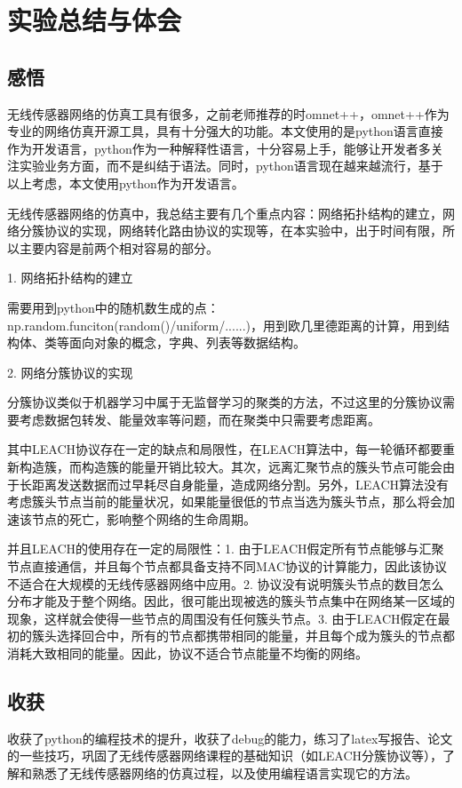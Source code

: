 \documentclass[UTF8]{article} %
\begin{document}
	\section{实验总结与体会}
	\subsection{感悟}
	无线传感器网络的仿真工具有很多，之前老师推荐的时omnet++，omnet++作为专业的网络仿真开源工具，具有十分强大的功能。本文使用的是python语言直接作为开发语言，python作为一种解释性语言，十分容易上手，能够让开发者多关注实验业务方面，而不是纠结于语法。同时，python语言现在越来越流行，基于以上考虑，本文使用python作为开发语言。
	
	无线传感器网络的仿真中，我总结主要有几个重点内容：网络拓扑结构的建立，网络分簇协议的实现，网络转化路由协议的实现等，在本实验中，出于时间有限，所以主要内容是前两个相对容易的部分。
	
	1. 网络拓扑结构的建立
	
	需要用到python中的随机数生成的点：np.random.funciton(random()/uniform/......)，用到欧几里德距离的计算，用到结构体、类等面向对象的概念，字典、列表等数据结构。
	
	2. 网络分簇协议的实现
	
	分簇协议类似于机器学习中属于无监督学习的聚类的方法，不过这里的分簇协议需要考虑数据包转发、能量效率等问题，而在聚类中只需要考虑距离。
	
	其中LEACH协议存在一定的缺点和局限性，在LEACH算法中，每一轮循环都要重新构造簇，而构造簇的能量开销比较大。其次，远离汇聚节点的簇头节点可能会由于长距离发送数据而过早耗尽自身能量，造成网络分割。另外，LEACH算法没有考虑簇头节点当前的能量状况，如果能量很低的节点当选为簇头节点，那么将会加速该节点的死亡，影响整个网络的生命周期。
	
	并且LEACH的使用存在一定的局限性：1. 由于LEACH假定所有节点能够与汇聚节点直接通信，并且每个节点都具备支持不同MAC协议的计算能力，因此该协议不适合在大规模的无线传感器网络中应用。2. 协议没有说明簇头节点的数目怎么分布才能及于整个网络。因此，很可能出现被选的簇头节点集中在网络某一区域的现象，这样就会使得一些节点的周围没有任何簇头节点。3. 由于LEACH假定在最初的簇头选择回合中，所有的节点都携带相同的能量，并且每个成为簇头的节点都消耗大致相同的能量。因此，协议不适合节点能量不均衡的网络。
	
	\subsection{收获}
	收获了python的编程技术的提升，收获了debug的能力，练习了latex写报告、论文的一些技巧，巩固了无线传感器网络课程的基础知识（如LEACH分簇协议等），了解和熟悉了无线传感器网络的仿真过程，以及使用编程语言实现它的方法。
	
	
\end{document}
